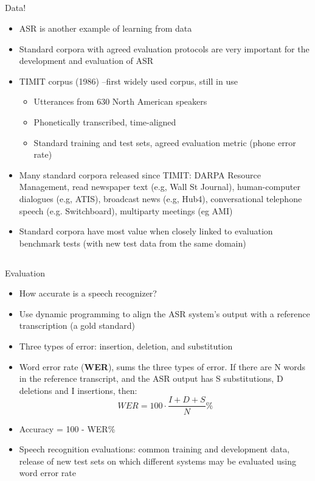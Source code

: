 \documentclass[9pt,xcolor=pdftex,dvipsnames,table]{beamer}
\begin{document}
\subsection{}
\begin{frame}{Data!}

\begin{itemize}
	\item ASR is another example of learning from data
	\item Standard corpora with agreed evaluation protocols are very
important for the development and evaluation of ASR
	\item TIMIT corpus (1986) --first widely used corpus, still in use
	\begin{itemize}
		\item Utterances from 630 North American speakers
		\item Phonetically transcribed, time-aligned
		\item Standard training and test sets, agreed evaluation metric
(phone error rate)
	\end{itemize}
	\item Many standard corpora released since TIMIT: DARPA
Resource Management, read newspaper text (e.g, Wall St
Journal), human-computer dialogues (e.g, ATIS), broadcast
news (e.g, Hub4), conversational telephone speech (e.g. Switchboard), multiparty meetings (eg AMI)
	\item Standard corpora have most value when closely linked to evaluation
benchmark tests (with new test data from the same domain)

\end{itemize}

\end{frame}

\subsection{}
\begin{frame}{Evaluation}

\begin{itemize}
	\item How accurate is a speech recognizer?
	\item Use dynamic programming to align the ASR system's output with a reference transcription (a gold standard)
	\item Three types of error: insertion, deletion, and substitution
	\item Word error rate (\textbf{WER}), sums the three types of error.  If there
are N words in the reference transcript, and the ASR output
has S substitutions, D deletions and I insertions, then:
		\begin{equation*}WER = 100 \cdot \frac{I + D + S}{N}\%\end{equation*}
	\item Accuracy = 100 - WER\%
	\item Speech recognition evaluations: common training and development data, release of new test sets on which different systems may be evaluated using word error rate
\end{itemize}

\end{frame}
\end{document}
